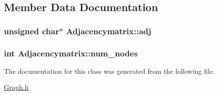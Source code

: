 \subsection{Member Data Documentation}
\hypertarget{class_adjacencymatrix_a56fd4182b2be467d545e3afd4ec47992}{}
\subsubsection[{adj}]{\setlength{\rightskip}{0pt plus 5cm}unsigned char$\ast$ Adjacencymatrix\+::adj\hspace{0.3cm}{\ttfamily [private]}}\label{class_adjacencymatrix_a56fd4182b2be467d545e3afd4ec47992}
\hypertarget{class_adjacencymatrix_a9f2232f0d4c8d2fef4e62d19de68c3df}{}
\subsubsection[{num\+\_\+nodes}]{\setlength{\rightskip}{0pt plus 5cm}int Adjacencymatrix\+::num\+\_\+nodes\hspace{0.3cm}{\ttfamily [private]}}\label{class_adjacencymatrix_a9f2232f0d4c8d2fef4e62d19de68c3df}


The documentation for this class was generated from the following file\+:\begin{DoxyCompactItemize}
\item 
\hyperlink{_graph_8h}{Graph.\+h}\end{DoxyCompactItemize}
